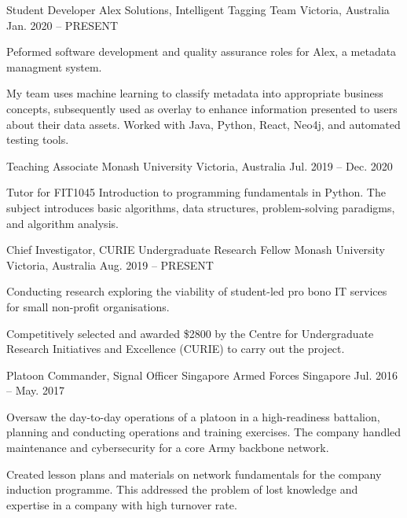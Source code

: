 \begin{cventries}
\cventry
    {Student Developer}
    {Alex Solutions, Intelligent Tagging Team}
    {Victoria, Australia}
    {Jan. 2020 – PRESENT}
    {
      \begin{cvitems}
        \item {Peformed software development and quality assurance roles for Alex, a metadata managment system.}
        \item {My team uses machine learning to classify metadata into appropriate business concepts, subsequently used as overlay to enhance information presented to users about their data assets. Worked with Java, Python, React, Neo4j, and automated testing tools.}
      \end{cvitems}
    }
	\cventry
    {Teaching Associate}
    {Monash University}
    {Victoria, Australia}
    {Jul. 2019 – Dec. 2020}
    {
      \begin{cvitems}
        \item {Tutor for FIT1045 Introduction to programming fundamentals in Python. The subject introduces basic algorithms, data structures, problem-solving paradigms, and algorithm analysis.}
      \end{cvitems}
    }
    \cventry
    {Chief Investigator, CURIE Undergraduate Research Fellow}
    {Monash University}
    {Victoria, Australia}
    {Aug. 2019 – PRESENT}
    {
      \begin{cvitems}
        \item {Conducting research exploring the viability of student-led pro bono IT services for small non-profit organisations.}
        \item {Competitively selected and awarded \$2800 by the Centre for Undergraduate Research Initiatives and Excellence (CURIE) to carry out the project.}
      \end{cvitems}
    }
  \cventry
    {Platoon Commander, Signal Officer}
    {Singapore Armed Forces}
    {Singapore}
    {Jul. 2016 – May. 2017}
    {
      \begin{cvitems}
        \item {Oversaw the day-to-day operations of a platoon in a high-readiness battalion, planning and conducting operations and training exercises. The company handled maintenance and cybersecurity for a core Army backbone network.}
        \item {Created lesson plans and materials on network fundamentals for the company induction programme. This addressed the problem of lost knowledge and expertise in a company with high turnover rate.}

\end{cvitems}}
\end{cventries}
